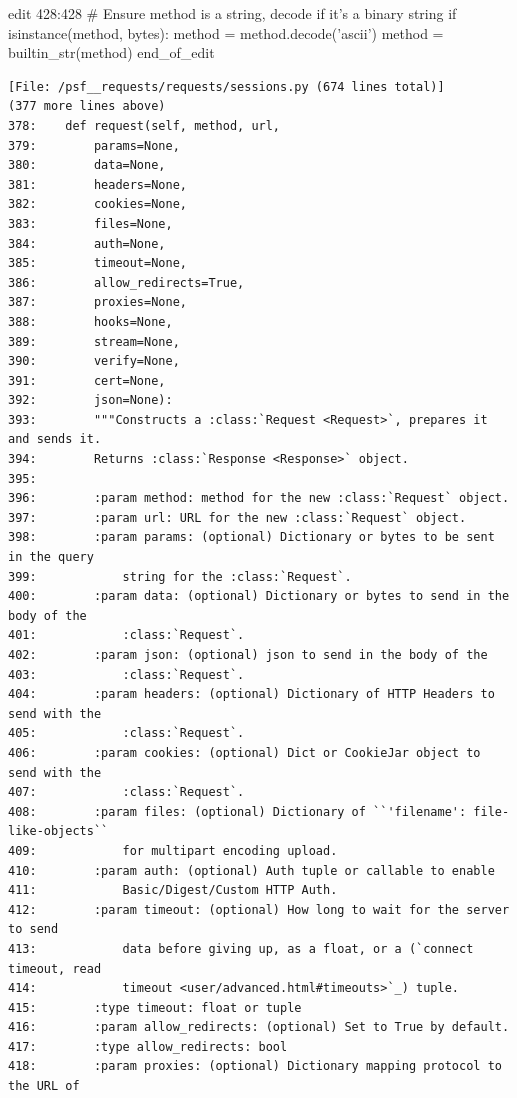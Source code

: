 {\begin{agentbox}
\hrulefill
\begin{CodeVerbatim}[breaklines=true, breakanywhere=true]
edit 428:428
        # Ensure method is a string, decode if it's a binary string
        if isinstance(method, bytes):
            method = method.decode('ascii')
        method = builtin_str(method)
end_of_edit
\end{CodeVerbatim}
\end{agentbox}
\begin{observationbox}\begin{Verbatim}[breaklines=true, breakanywhere=true]
[File: /psf__requests/requests/sessions.py (674 lines total)]
(377 more lines above)
378:    def request(self, method, url,
379:        params=None,
380:        data=None,
381:        headers=None,
382:        cookies=None,
383:        files=None,
384:        auth=None,
385:        timeout=None,
386:        allow_redirects=True,
387:        proxies=None,
388:        hooks=None,
389:        stream=None,
390:        verify=None,
391:        cert=None,
392:        json=None):
393:        """Constructs a :class:`Request <Request>`, prepares it and sends it.
394:        Returns :class:`Response <Response>` object.
395:
396:        :param method: method for the new :class:`Request` object.
397:        :param url: URL for the new :class:`Request` object.
398:        :param params: (optional) Dictionary or bytes to be sent in the query
399:            string for the :class:`Request`.
400:        :param data: (optional) Dictionary or bytes to send in the body of the
401:            :class:`Request`.
402:        :param json: (optional) json to send in the body of the
403:            :class:`Request`.
404:        :param headers: (optional) Dictionary of HTTP Headers to send with the
405:            :class:`Request`.
406:        :param cookies: (optional) Dict or CookieJar object to send with the
407:            :class:`Request`.
408:        :param files: (optional) Dictionary of ``'filename': file-like-objects``
409:            for multipart encoding upload.
410:        :param auth: (optional) Auth tuple or callable to enable
411:            Basic/Digest/Custom HTTP Auth.
412:        :param timeout: (optional) How long to wait for the server to send
413:            data before giving up, as a float, or a (`connect timeout, read
414:            timeout <user/advanced.html#timeouts>`_) tuple.
415:        :type timeout: float or tuple
416:        :param allow_redirects: (optional) Set to True by default.
417:        :type allow_redirects: bool
418:        :param proxies: (optional) Dictionary mapping protocol to the URL of

\end{Verbatim}
\end{observationbox}}
